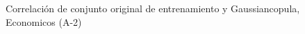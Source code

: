 \begin{figure}[H]
    \centering
    
    \caption{Correlación de conjunto original de entrenamiento y Gaussiancopula, Economicos (A-2)}
    \label{pairwise-economicos-a-2-gaussiancopula}
\end{figure}